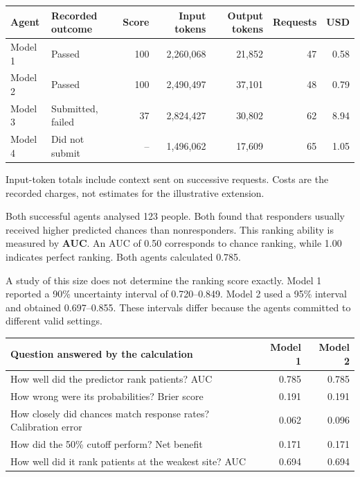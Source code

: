 \begingroup\footnotesize
\begin{tabularx}{\textwidth}{@{}Ylrrrrr@{}}\toprule
Agent & Recorded outcome & Score & Input tokens & Output tokens & Requests & USD \\\midrule
Model 1 & Passed & 100 & 2,260,068 & 21,852 & 47 & 0.58 \\
Model 2 & Passed & 100 & 2,490,497 & 37,101 & 48 & 0.79 \\
Model 3 & Submitted, failed & 37 & 2,824,427 & 30,802 & 62 & 8.94 \\
Model 4 & Did not submit & -- & 1,496,062 & 17,609 & 65 & 1.05 \\\bottomrule
\end{tabularx}
\endgroup
{}

Input-token totals include context sent on successive requests. Costs are the recorded charges, not estimates for the illustrative extension.

Both successful agents analysed 123 people. Both found that responders usually received higher predicted chances than nonresponders. This ranking ability is measured by \textbf{AUC}. An AUC of 0.50 corresponds to chance ranking, while 1.00 indicates perfect ranking. Both agents calculated 0.785.

A study of this size does not determine the ranking score exactly. Model 1 reported a 90\% uncertainty interval of 0.720--0.849. Model 2 used a 95\% interval and obtained 0.697--0.855. These intervals differ because the agents committed to different valid settings.

\begin{tabularx}{\textwidth}{@{}Yrr@{}}\toprule
Question answered by the calculation & Model 1 & Model 2 \\\midrule
How well did the predictor rank patients? AUC & 0.785 & 0.785 \\
How wrong were its probabilities? Brier score & 0.191 & 0.191 \\
How closely did chances match response rates? Calibration error & 0.062 & 0.096 \\
How did the 50\% cutoff perform? Net benefit & 0.171 & 0.171 \\
How well did it rank patients at the weakest site? AUC & 0.694 & 0.694 \\\bottomrule
\end{tabularx}

